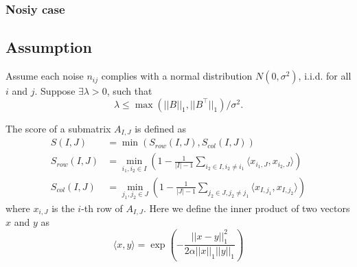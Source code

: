 \documentclass[journal]{IEEEtran}
\begin{document}
\subsubsection{Nosiy case}
\subsection{Assumption}
Assume each noise $n_{ij}$ complies with a normal distribution $N(0, \sigma^2)$, i.i.d. for all $i$ and $j$. Suppose $\exists \lambda > 0$, such that
$$\lambda \le \max(||B||_1, ||B^\top||_1)/\sigma^2.$$


The score of a submatrix $A_{I,J}$ is defined as
\begin{align}
  S(I,J)       & = \min(S_{row}(I,J), S_{col}(I,J))                                                                                          \\
  S_{row}(I,J) & = \min_{i_1, i_2 \in I} \left(1- \frac{1}{|I|-1} \sum_{i_2 \in I, i_2 \neq i_1} \langle x_{i_1,J}, x_{i_2,J}\rangle \right) \\
  S_{col}(I,J) & = \min_{j_1, j_2 \in J} \left(1- \frac{1}{|J|-1} \sum_{j_2 \in J, j_2 \neq j_1} \langle x_{I,j_1}, x_{I,j_2}\rangle \right)
\end{align}
where $x_{i,J}$ is the $i$-th row of $A_{I,J}$. Here we define the inner product of two vectors $x$ and $y$ as
$$\langle x, y \rangle = \exp(-\frac{||x - y||_1^2}{2\alpha||x||_1||y||_1})$$
\end{document}
